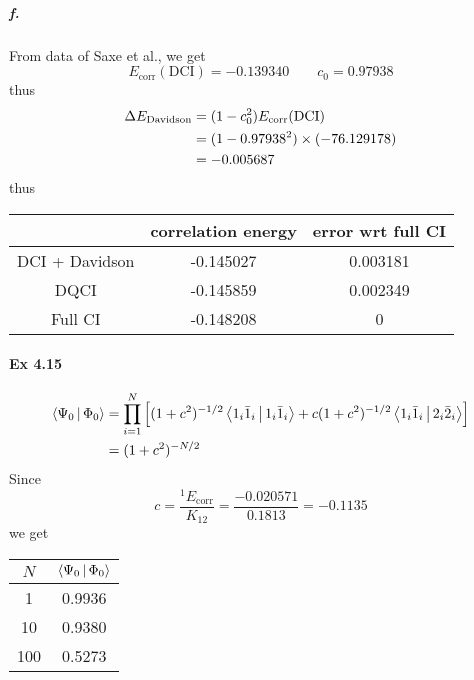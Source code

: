 \documentclass[a4paper]{article}
\DeclareMathOperator{\corr}{\mathrm{corr}}
\newcommand{\ex}[1]{\paragraph{Ex #1}}
\newcommand{\subex}[1]{\subparagraph{#1}}
\numberwithin{equation}{subsection}
\begin{document}
\newpage
\subex{f.}
From data of Saxe et al., we get
\begin{equation}\label{key}
E_{\corr}(\text{DCI}) = -0.139340 \qquad c_0 = 0.97938
\end{equation}
thus
\begin{align}
\Delta E_{\text{Davidson}} &= (1 - c_0^2)E_{\corr}(\text{DCI}) \notag\\
&= (1 - 0.97938^2)\times(-76.129178) \notag\\
&= -0.005687
\end{align}
thus
\begin{table}[H]
	\begin{tabular}{ccc}
		\hline
		& correlation energy & error wrt full CI \\ \hline
		DCI + Davidson & -0.145027 & 0.003181\\
		DQCI           & -0.145859 & 0.002349\\
		Full CI        & -0.148208 & 0\\ \hline
	\end{tabular}
\end{table}

\ex{4.15}
\begin{align}
\Braket{\Psi_0 | \Phi_0} &= \prod_{i=1}^N \qty[(1+c^2)^{-1/2}\Braket{1_i\bar{1}_i|1_i\bar{1}_i} + c(1+c^2)^{-1/2}\Braket{1_i\bar{1}_i|2_i\bar{2}_i}] \notag\\
&= (1+c^2)^{-N/2}
\end{align}
Since 
\begin{equation}\label{key}
c = \dfrac{{^1 E}_{\corr}}{K_{12}} = \dfrac{-0.020571}{0.1813} = -0.1135
\end{equation}
we get
\begin{table}[H]
	\begin{tabular}{cc}
		\hline
		$ N $ & $ \Braket{\Psi_0 | \Phi_0} $ \\ \hline
		1 & 0.9936 \\
		10 & 0.9380 \\
		100 & 0.5273 \\ \hline
	\end{tabular}
\end{table}
\end{document}
